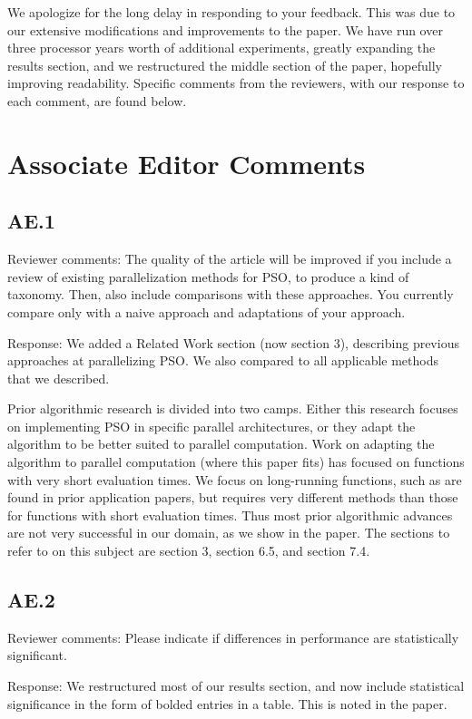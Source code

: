 \documentclass[onecolumn, 12pt]{article}
\begin{document}
We apologize for the long delay in responding to your feedback.  This was due
to our extensive modifications and improvements to the paper.  We have run over
three processor years worth of additional experiments, greatly expanding the
results section, and we restructured the middle section of the paper, hopefully
improving readability.  Specific comments from the reviewers, with our response
to each comment, are found below.

\section*{Associate Editor Comments}

\subsection*{AE.1}

Reviewer comments: The quality of the article will be improved if you include a
review of existing parallelization methods for PSO, to produce a kind of
taxonomy. Then, also include comparisons with these approaches. You currently
compare only with a naive approach and adaptations of your approach.

Response: We added a Related Work section (now section 3), describing previous
approaches at parallelizing PSO.  We also compared to all applicable methods
that we described.

Prior algorithmic research is divided into two camps.  Either this research
focuses on implementing PSO in specific parallel architectures, or they adapt
the algorithm to be better suited to parallel computation.  Work on adapting
the algorithm to parallel computation (where this paper fits) has focused on
functions with very short evaluation times.  We focus on long-running
functions, such as are found in prior application papers, but requires very
different methods than those for functions with short evaluation times.  Thus
most prior algorithmic advances are not very successful in our domain, as we
show in the paper.  The sections to refer to on this subject are section 3,
section 6.5, and section 7.4.

\subsection*{AE.2}

Reviewer comments: Please indicate if differences in performance are
statistically significant.

Response: We restructured most of our results section, and now include
statistical significance in the form of bolded entries in a table.  This is
noted in the paper.
\end{document}
